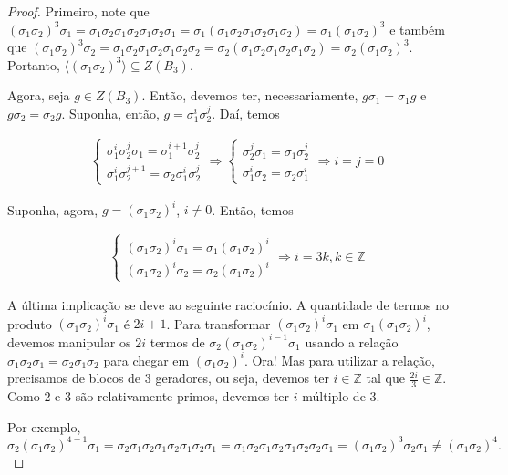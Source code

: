 \documentclass[a4paper,portuguese,11pt,twoside, leqno]{book}
\theoremstyle{definition}
\begin{document}
	\begin{proof}
		Primeiro, note que $(\sigma_1\sigma_2)^3\sigma_1 = \sigma_1\sigma_2\sigma_1\sigma_2\sigma_1\sigma_2\sigma_1 = \sigma_1(\sigma_1\sigma_2\sigma_1\sigma_2\sigma_1\sigma_2) = \sigma_1(\sigma_1\sigma_2)^3$ e também que $(\sigma_1\sigma_2)^3\sigma_2 = \sigma_1\sigma_2\sigma_1\sigma_2\sigma_1\sigma_2\sigma_2 = \sigma_2(\sigma_1\sigma_2\sigma_1\sigma_2\sigma_1\sigma_2) = \sigma_2(\sigma_1\sigma_2)^3$. Portanto, $\langle (\sigma_1\sigma_2)^3 \rangle\subseteq Z(B_3)$.
		
		\par\vspace{0.3cm} Agora, seja $g\in Z(B_3)$. Então, devemos ter, necessariamente, $g\sigma_1 = \sigma_1g$ e $g\sigma_2 = \sigma_2g$. Suponha, então, $g = \sigma_1^i\sigma_2^j$. Daí, temos
		
		\begin{align*}
		\begin{cases}
		\sigma_1^i\sigma_2^j\sigma_1 = \sigma_1^{i+1}\sigma_2^j \\
		\sigma_1^i\sigma_2^{j+1} = \sigma_2\sigma_1^{i}\sigma_2^j
		\end{cases} \Rightarrow \begin{cases}
		\sigma_2^j\sigma_1 = \sigma_1\sigma_2^j \\
		\sigma_1^i\sigma_2 = \sigma_2\sigma_1^i
		\end{cases} \Rightarrow i = j = 0 
		\end{align*} 
		
		\par\vspace{0.3cm} Suponha, agora, $g = (\sigma_1\sigma_2)^i$, $i\neq 0$. Então, temos
		
		\begin{align*}
		\begin{cases}
		(\sigma_1\sigma_2)^i\sigma_1 = \sigma_1(\sigma_1\sigma_2)^i \\
		(\sigma_1\sigma_2)^i\sigma_2 = \sigma_2(\sigma_1\sigma_2)^i
		\end{cases} \Rightarrow i = 3k, k\in\mathbb{Z}
		\end{align*}
		
		\par\vspace{0.3cm} A última implicação se deve ao seguinte raciocínio. A quantidade de termos no produto $(\sigma_1\sigma_2)^i\sigma_1$ é $2i+1$. Para transformar $(\sigma_1\sigma_2)^i\sigma_1$ em $\sigma_1(\sigma_1\sigma_2)^i$, devemos manipular os $2i$ termos de $\sigma_2(\sigma_1\sigma_2)^{i-1}\sigma_1$ usando a relação $\sigma_1\sigma_2\sigma_1 = \sigma_2\sigma_1\sigma_2$ para chegar em $(\sigma_1\sigma_2)^i$. Ora! Mas para utilizar a relação, precisamos de blocos de $3$ geradores, ou seja, devemos ter $i\in\mathbb{Z}$ tal que $\displaystyle{\frac{2i}{3}\in\mathbb{Z}}$. Como $2$ e $3$ são relativamente primos, devemos ter $i$ múltiplo de $3$.
		\par Por exemplo, $$\sigma_2(\sigma_1\sigma_2)^{4-1}\sigma_1 = \sigma_2\sigma_1\sigma_2\sigma_1\sigma_2\sigma_1\sigma_2\sigma_1 = \sigma_1\sigma_2\sigma_1\sigma_2\sigma_1\sigma_2\sigma_2\sigma_1 = (\sigma_1\sigma_2)^3\sigma_2\sigma_1\neq(\sigma_1\sigma_2)^4.$$
		

\end{proof}
\end{document}
